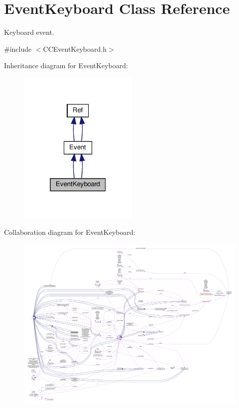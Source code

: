 \hypertarget{classEventKeyboard}{}\section{Event\+Keyboard Class Reference}
\label{classEventKeyboard}


Keyboard event.  




{\ttfamily \#include $<$C\+C\+Event\+Keyboard.\+h$>$}



Inheritance diagram for Event\+Keyboard\+:
\nopagebreak
\begin{figure}[H]
\begin{center}
\leavevmode
\includegraphics[width=163pt]{classEventKeyboard__inherit__graph}
\end{center}
\end{figure}


Collaboration diagram for Event\+Keyboard\+:
\nopagebreak
\begin{figure}[H]
\begin{center}
\leavevmode
\includegraphics[width=350pt]{classEventKeyboard__coll__graph}
\end{center}
\end{figure}
